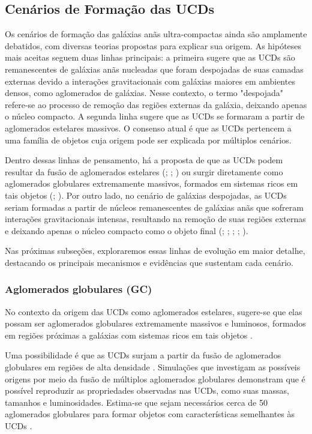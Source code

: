 \subsection{Cenários de Formação das UCDs}\label{subsec:formacao}
Os cenários de formação das galáxias anãs ultra-compactas ainda são amplamente debatidos, com diversas teorias propostas para explicar sua origem. As hipóteses mais aceitas seguem duas linhas principais: a primeira sugere que as UCDs são remanescentes de galáxias anãs nucleadas que foram despojadas de suas camadas externas devido a interações gravitacionais com galáxias maiores em ambientes densos, como aglomerados de galáxias. Nesse contexto, o termo "despojada" refere-se ao processo de remoção das regiões externas da galáxia, deixando apenas o núcleo compacto. A segunda linha sugere que as UCDs se formaram a partir de aglomerados estelares massivos. O consenso atual é que as UCDs pertencem a uma família de objetos cuja origem pode ser explicada por múltiplos cenários.

Dentro dessas linhas de pensamento, há a proposta de que as UCDs podem resultar da fusão de aglomerados estelares (\citealp{Kroupa_1998}; \citealp{Fellhauer_2002}; \citealp{Br_ns_2012}) ou surgir diretamente como aglomerados globulares extremamente massivos, formados em sistemas ricos em tais objetos (\citealp{Mieske_2002}; \citealp{Mieske_2011}). Por outro lado, no cenário de galáxias despojadas, as UCDs seriam formadas a partir de núcleos remanescentes de galáxias anãs que sofreram interações gravitacionais intensas, resultando na remoção de suas regiões externas e deixando apenas o núcleo compacto como o objeto final (\citealp{Bassino_1994}; \citealp{Bekki_2001}; \citealp{Drinkwater_2003}; \citealp{Goerdt_2008}; \citealp{Pfeffer_2013}).

Nas próximas subseções, exploraremos essas linhas de evolução em maior detalhe, destacando os principais mecanismos e evidências que sustentam cada cenário.

\subsubsection{Aglomerados globulares (GC)}\label{subsubsec:}
No contexto da origem das UCDs como aglomerados estelares, sugere-se que elas possam ser aglomerados globulares extremamente massivos e luminosos, formados em regiões próximas a galáxias com sistemas ricos em tais objetos \citep{Mieske_2002}.

Uma possibilidade é que as UCDs surjam a partir da fusão de aglomerados globulares em regiões de alta densidade \citep{Fellhauer_2002}. Simulações que investigam as possíveis origens por meio da fusão de múltiplos aglomerados globulares \citep{Goerdt_2008} demonstram que é possível reproduzir as propriedades observadas nas UCDs, como suas massas, tamanhos e luminosidades. Estima-se que sejam necessários cerca de 50 aglomerados globulares para formar objetos com características semelhantes às UCDs \citep{Goerdt_2008}.

